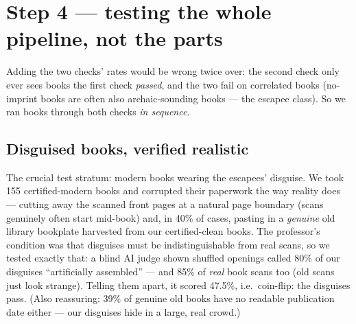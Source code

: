 \documentclass[11pt]{article}
\begin{document}
\section{Step 4 --- testing the whole pipeline, not the parts}
Adding the two checks' rates would be wrong twice over: the second check only ever sees books the
first check \emph{passed}, and the two fail on correlated books (no-imprint books are often also
archaic-sounding books --- the escapee class). So we ran books through both checks \emph{in sequence}.

\subsection{Disguised books, verified realistic}
The crucial test stratum: modern books wearing the escapees' disguise. We took 155 certified-modern
books and corrupted their paperwork the way reality does --- cutting away the scanned front pages at a
natural page boundary (scans genuinely often start mid-book) and, in 40\% of cases, pasting in a
\emph{genuine} old library bookplate harvested from our certified-clean books. The professor's
condition was that disguises must be indistinguishable from real scans, so we tested exactly that: a
blind AI judge shown shuffled openings called 80\% of our disguises ``artificially assembled'' --- and
85\% of \emph{real} book scans too (old scans just look strange). Telling them apart, it scored 47.5\%,
i.e.\ coin-flip: the disguises pass. (Also reassuring: 39\% of genuine old books have no readable
publication date either --- our disguises hide in a large, real crowd.)
\end{document}
